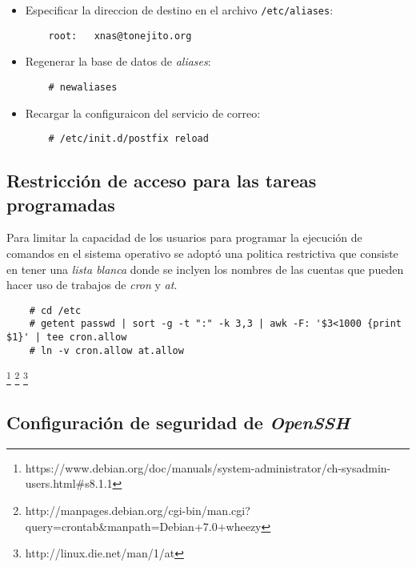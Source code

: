 \begin{itemize}
  \item Especificar la direccion de destino en el archivo \texttt{/etc/aliases}:

{
\scriptsize
\linespread{1}
\begin{verbatim}
    root:	xnas@tonejito.org
\end{verbatim}
}

  \item Regenerar la base de datos de \textit{aliases}:

{
\scriptsize
\linespread{1}
\begin{verbatim}
    # newaliases
\end{verbatim}
}

  \item Recargar la configuraicon del servicio de correo:

{
\scriptsize
\linespread{1}
\begin{verbatim}
    # /etc/init.d/postfix reload
\end{verbatim}
}

\end{itemize}

      \subsection {Restricci\'{o}n de acceso para las tareas programadas}

Para limitar la capacidad de los usuarios para programar la ejecuci\'{o}n de comandos en el sistema operativo se adopt\'{o} una politica restrictiva que consiste en tener una \textit{lista blanca} donde se inclyen los nombres de las cuentas que pueden hacer uso de trabajos de \textsl{cron} y \textsl{at}.

{
\scriptsize
\linespread{1}
\begin{verbatim}
    # cd /etc
    # getent passwd | sort -g -t ":" -k 3,3 | awk -F: '$3<1000 {print $1}' | tee cron.allow
    # ln -v cron.allow at.allow
\end{verbatim}
}
\footnote{https://www.debian.org/doc/manuals/system-administrator/ch-sysadmin-users.html\#s8.1.1}
\footnote{http://manpages.debian.org/cgi-bin/man.cgi?query=crontab\&manpath=Debian+7.0+wheezy}
\footnote{http://linux.die.net/man/1/at}

      \subsection {Configuraci\'{o}n de seguridad de \textsl{OpenSSH}}

